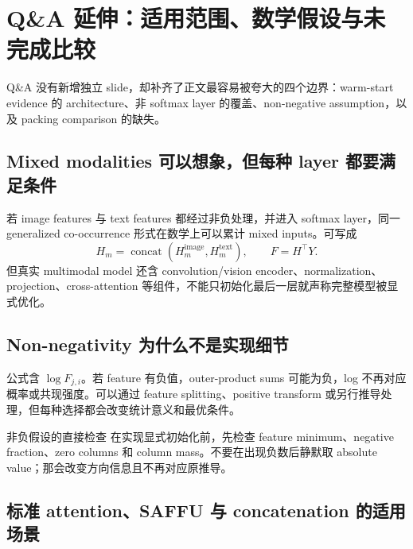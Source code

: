 \section{Q\&A 延伸：适用范围、数学假设与未完成比较}

Q\&A 没有新增独立 slide，却补齐了正文最容易被夸大的四个边界：warm-start evidence 的 architecture、非 softmax layer 的覆盖、non-negative assumption，以及 packing comparison 的缺失。

\subsection{Mixed modalities 可以想象，但每种 layer 都要满足条件}

若 image features 与 text features 都经过非负处理，并进入 softmax layer，同一 generalized co-occurrence 形式在数学上可以累计 mixed inputs。可写成
\[
H_m=\operatorname{concat}(H_m^{\text{image}},H_m^{\text{text}}),
\qquad F=H^\top Y.
\]
但真实 multimodal model 还含 convolution/vision encoder、normalization、projection、cross-attention 等组件，不能只初始化最后一层就声称完整模型被显式优化。


\subsection{Non-negativity 为什么不是实现细节}

公式含 $\log F_{j,i}$。若 feature 有负值，outer-product sums 可能为负，log 不再对应概率或共现强度。可以通过 feature splitting、positive transform 或另行推导处理，但每种选择都会改变统计意义和最优条件。

\begin{importantbox}{非负假设的直接检查}
在实现显式初始化前，先检查 feature minimum、negative fraction、zero columns 和 column mass。不要在出现负数后静默取 absolute value；那会改变方向信息且不再对应原推导。
\end{importantbox}


\subsection{标准 attention、SAFFU 与 concatenation 的适用场景}

